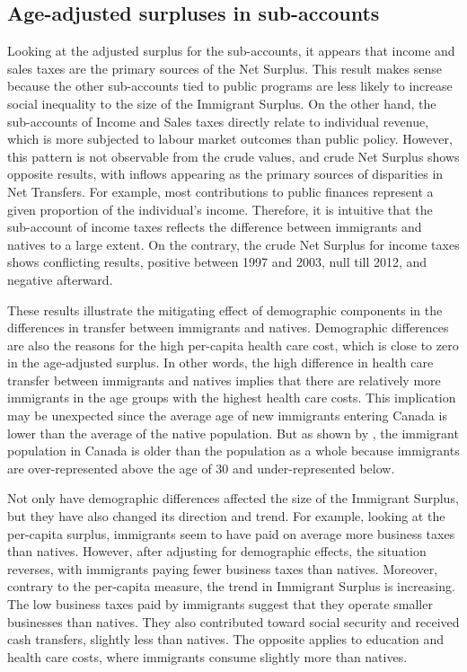 \subsection{Age-adjusted surpluses in sub-accounts}

Looking at the adjusted surplus for the sub-accounts, it appears that income and sales taxes are the primary sources of the Net Surplus.
This result makes sense because the other sub-accounts tied to public programs are less likely to increase social inequality to the size of the Immigrant Surplus.
On the other hand, the sub-accounts of Income and Sales taxes directly relate to individual revenue, which is more subjected to labour market outcomes than public policy.
However, this pattern is not observable from the crude values, and crude Net Surplus shows opposite results, with inflows appearing as the primary sources of disparities in Net Transfers.
For example, most contributions to public finances represent a given proportion of the individual's income.
Therefore, it is intuitive that the sub-account of income taxes reflects the difference between immigrants and natives to a large extent.
On the contrary, the crude Net Surplus for income taxes shows conflicting results, positive between 1997 and 2003, null till 2012, and negative afterward.

\vspace{0.7em}\par
These results illustrate the mitigating effect of demographic components in the differences in transfer between immigrants and natives.
Demographic differences are also the reasons for the high per-capita health care cost, which is close to zero in the age-adjusted surplus.
In other words, the high difference in health care transfer between immigrants and natives implies that there are relatively more immigrants in the age groups with the highest health care costs.
This implication may be unexpected since the average age of new immigrants entering Canada is lower than the average of the native population.
But as shown by \citet[p~244]{Malenfant.2011}, the immigrant population in Canada is older than the population as a whole because immigrants are over-represented above the age of 30 and under-represented below.

\vspace{0.7em}\par
Not only have demographic differences affected the size of the Immigrant Surplus, but they have also changed its direction and trend.
For example, looking at the per-capita surplus, immigrants seem to have paid on average more business taxes than natives.
However, after adjusting for demographic effects, the situation reverses, with immigrants paying fewer business taxes than natives. Moreover, contrary to the per-capita measure, the trend in Immigrant Surplus is increasing.
The low business taxes paid by immigrants suggest that they operate smaller businesses than natives.
They also contributed toward social security and received cash transfers, slightly less than natives.
The opposite applies to education and health care costs, where immigrants consume slightly more than natives.

